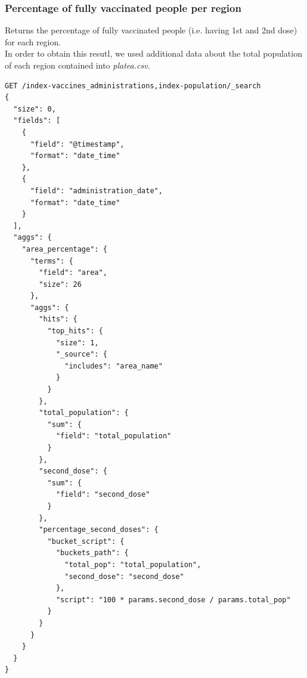 \documentclass[12pt, a4paper]{article}
\begin{document}
\subsubsection{Percentage of fully vaccinated people per region}
Returns the percentage of fully vaccinated people (i.e. having 1st and 2nd dose) 
for each region. \\
In order to obtain this resutl, we used additional data about the total population of 
each region contained into \emph{platea.csv}.
\begin{tcolorbox}[fontupper=\scriptsize]
  \begin{verbatim}
GET /index-vaccines_administrations,index-population/_search 
{
  "size": 0,
  "fields": [
    {
      "field": "@timestamp",
      "format": "date_time"
    },
    {
      "field": "administration_date",
      "format": "date_time"
    }
  ],
  "aggs": {
    "area_percentage": {
      "terms": {
        "field": "area",
        "size": 26
      },
      "aggs": {
        "hits": {
          "top_hits": {
            "size": 1,
            "_source": {
              "includes": "area_name"
            }
          }
        },
        "total_population": {
          "sum": {
            "field": "total_population"
          }
        },
        "second_dose": {
          "sum": {
            "field": "second_dose"
          }
        },
        "percentage_second_doses": {
          "bucket_script": {
            "buckets_path": {
              "total_pop": "total_population",
              "second_dose": "second_dose"
            },
            "script": "100 * params.second_dose / params.total_pop"
          }
        }
      }
    }
  }
}
  \end{verbatim}
\end{tcolorbox}
\end{document}
